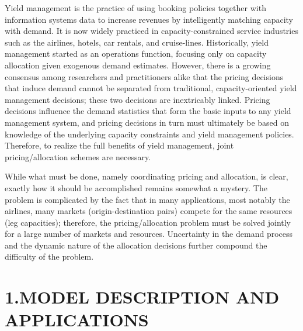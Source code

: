 Yield management is the practice of using booking policies together with information systems data to increase revenues by intelligently matching capacity with demand. It is now widely practiced in capacity-constrained service industries such as the airlines, hotels, car rentals, and cruise-lines. Historically, yield management started as an operations function, focusing only on capacity allocation given exogenous demand estimates. However, there is a growing consensus among researchers and practitioners alike that the pricing decisions that induce demand cannot be separated from traditional, capacity-oriented yield management decisions; these two decisions are inextricably linked. Pricing decisions influence the demand statistics that form the basic inputs to any yield management system, and pricing decisions in turn must ultimately be based on knowledge of the underlying capacity constraints and yield management policies. Therefore, to realize the full benefits of yield management, joint pricing/allocation schemes are necessary.

While what must be done, namely coordinating pricing and allocation, is clear, exactly how it should be accomplished remains somewhat a mystery. The problem is complicated by the fact that in many applications, most notably the airlines, many markets (origin-destination pairs) compete for the same resources (leg capacities); therefore, the pricing/allocation problem must be solved jointly for a large number of markets and resources. Uncertainty in the demand process and the dynamic nature of the allocation decisions further compound the difficulty of the problem.

\section{1.MODEL DESCRIPTION AND APPLICATIONS}\label{model-description-and-applications}

